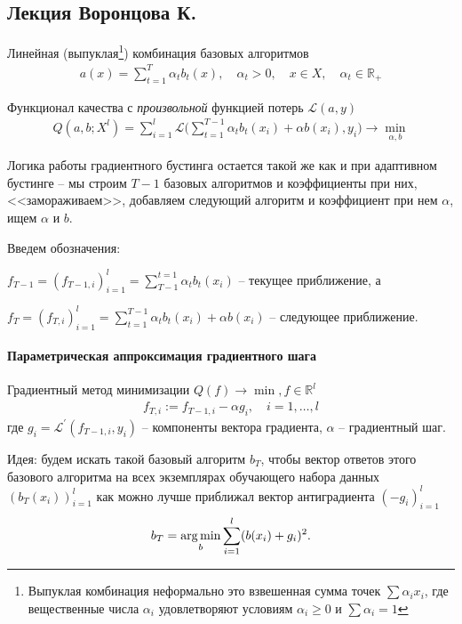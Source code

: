 \documentclass[%
	11pt,
	a4paper,
	utf8,
		]{article}
\begin{document}
\subsection{Лекция Воронцова К.}

Линейная (выпуклая\footnote{Выпуклая комбинация неформально это взвешенная сумма точек $ \sum \alpha_i x_i $, где вещественные числа $ \alpha_i $ удовлетворяют условиям $ \alpha_i \geqslant 0 $ и $ \sum \alpha_i = 1 $}) комбинация базовых алгоритмов
\begin{align*}
	a(x) = \sum_{t = 1}^{T} \alpha_t b_t(x), \quad \alpha_t > 0, \quad x \in X, \quad \alpha_t \in \mathbb{R}_{+}
\end{align*}

Функционал качества с \emph{произвольной} функцией потерь $ \mathcal{L}(a, y) $
\begin{align*}
	Q(a, b; X^l) = \sum_{i=1}^{l} \mathcal{L}\Big( \sum_{t=1}^{T-1} \alpha_t b_t(x_i) + \alpha b(x_i), y_i\Big) \to \underset{\alpha, b}{\min}
\end{align*}

Логика работы градиентного бустинга остается такой же как и при адаптивном бустинге -- мы строим $ T - 1 $ базовых алгоритмов и коэффициенты при них, <<замораживаем>>, добавляем следующий алгоритм и коэффициент при нем $ \alpha $, ищем $ \alpha $ и $ b $.

Введем обозначения:

$ f_{T - 1} = (f_{T - 1, i})_{i = 1}^l = \sum^{t=1}_{T - 1} \alpha_t b_t(x_i) $ -- текущее приближение, а

$ f_T = (f_{T, i})_{i = 1}^l = \sum_{t=1}^{T-1} \alpha_t b_t(x_i) + \alpha b(x_i) $ -- следующее приближение.

\paragraph{Параметрическая аппроксимация градиентного шага} Градиентный метод минимизации $ Q(f) \to \min, f \in \mathbb{R}^l $
\begin{align*}
	f_{T, i} := f_{T-1, i} - \alpha g_i, \quad i = 1, \ldots, l
\end{align*}
где $ g_i = \mathcal{L}^{'}(f_{T-1, i}, y_i) $ -- компоненты вектора градиента, $ \alpha $ -- градиентный шаг.

Идея: будем искать такой базовый алгоритм $ b_T $, чтобы вектор ответов этого базового алгоритма на всех экземплярах обучающего набора данных $ (b_T(x_i))_{i = 1}^l $ как можно лучше приближал вектор антиградиента $ (-g_i)_{i = 1}^l $
\begin{align*}
	b_T = \underset{b}{\operatorname*{arg\,min}} \sum_{i=1}^{l} (b(x_i) + g_i)^2.
\end{align*}
\end{document}
